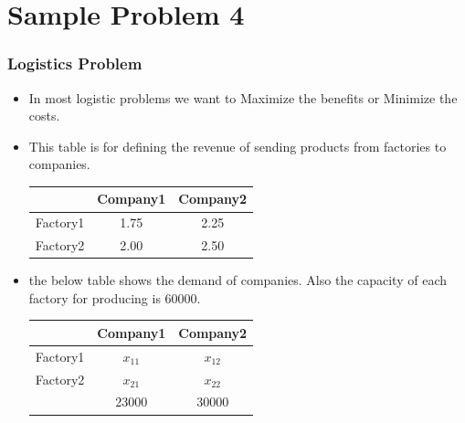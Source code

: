 \documentclass[presentation]{beamer}
\begin{document}
\section{Sample Problem 4}
\begin{frame}[fragile]
 \frametitle{Logistics Problem} 
  \begin{itemize}
    \item In most logistic problems we want to Maximize the benefits or Minimize the costs.
      \item This table is for defining the revenue of sending products from factories to companies.

  \begin{center}
    \begin{tabular}{ c | c | c }
      & Company1 & Company2 \\ \hline
      Factory1 & 1.75 & 2.25 \\  
      Factory2 & 2.00 & 2.50    
    \end{tabular}
  \end{center}

  \item the below table shows the demand of companies. Also the capacity of each factory for producing is 60000.


  \begin{center}
    \begin{tabular}{ c | c | c }
      & Company1 & Company2 \\ \hline
      Factory1 & $x_{11}$ & $x_{12}$ \\  
      Factory2 & $x_{21}$ & $x_{22}$ \\
      &23000 & 30000    
    \end{tabular}
  \end{center}
  \end{itemize}
\end{frame}
\end{document}
